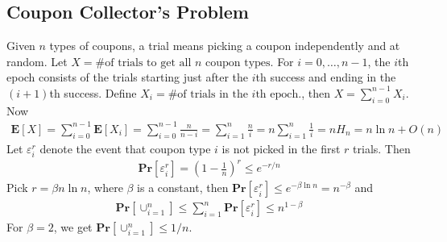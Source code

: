 \documentclass[12pt]{article}
\begin{document}
\subsection{Coupon Collector's Problem}
Given $n$ types of coupons, a trial means picking a coupon independently and at random. Let $X = \text{\# of trials to get all } n \text{ coupon types}$. For $i=0, \hdots, n-1$, the $i$th epoch consists of the trials starting just after the $i$th success and ending in the $(i+1)$th success. Define $X_i = \text{\# of trials in the } i\text{th epoch.}$, then $X=\sum_{i=0}^{n-1} X_i$. Now
\begin{align*}
\mathbf{E}\left[ X \right] = \sum_{i=0}^{n-1} \mathbf{E}\left[ X_i \right] = \sum_{i=0}^{n-1} \frac{n}{n-i} = \sum_{i=1}^{n} \frac{n}{i} =  n \sum_{i=1}^{n} \frac{1}{i} = n H_{n} = n \ln n + O(n)
\end{align*}
Let $\varepsilon_i^r$ denote the event that coupon type $i$ is not picked in the first $r$ trials. Then
\begin{align*}
\mathbf{Pr}\left[ \varepsilon_i^r \right] = \left(1-\frac{1}{n}\right)^r \leq e^{-r/n}
\end{align*}
Pick $r=\beta n \ln n$, where $\beta$ is a constant, then $\mathbf{Pr}\left[ \varepsilon_i^r \right] \leq e^{-\beta \ln n} = n^{-\beta}$ and
\begin{align*}
\mathbf{Pr}\left[ \cup_{i=1}^n \right] \leq \sum_{i=1}^n \mathbf{Pr}\left[ \varepsilon_i^r \right] \leq n^{1-\beta}
\end{align*}
For $\beta=2$, we get $\mathbf{Pr}\left[ \cup_{i=1}^n \right] \leq 1/n$.
\end{document}
